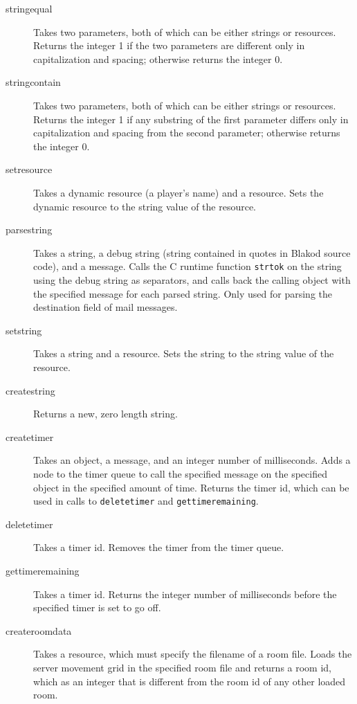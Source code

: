\begin{description}
\item[stringequal] Takes two parameters, both of which can be either strings
or resources.  Returns the integer 1 if the two parameters are different only
in capitalization and spacing; otherwise returns the integer 0.

\item[stringcontain] Takes two parameters, both of which can be either
strings or resources.  Returns the integer 1 if any substring of the first parameter 
differs only in capitalization and spacing from the second parameter; otherwise
returns the integer 0.

\item[setresource] Takes a dynamic resource (a player's name) and a resource.  Sets
the dynamic resource to the string value of the resource.

\item[parsestring] Takes a string, a debug string (string contained in quotes
in Blakod source code), and a message.  Calls the C runtime function \texttt{strtok}
on the string using the debug string as separators, and calls back the calling
object with the specified message for each parsed string.  Only used for parsing
the destination field of mail messages.

\item[setstring] Takes a string and a resource.  Sets the string to the string
value of the resource.

\item[createstring] Returns a new, zero length string.

\item[createtimer] Takes an object, a message, and an integer number of milliseconds.
Adds a node to the timer queue to call the specified message on the specified object
in the specified amount of time.  Returns the timer id, which can be used in calls
to \texttt{deletetimer} and \texttt{gettimeremaining}.

\item[deletetimer] Takes a timer id.  Removes the timer from the timer queue.

\item[gettimeremaining] Takes a timer id.  Returns the integer number of milliseconds
before the specified timer is set to go off.

\item[createroomdata] Takes a resource, which must specify the filename of a room
file.  Loads the server movement grid in the specified room file and returns a
room id, which as an integer that is different from the room id of any other loaded room.


\end{description}
